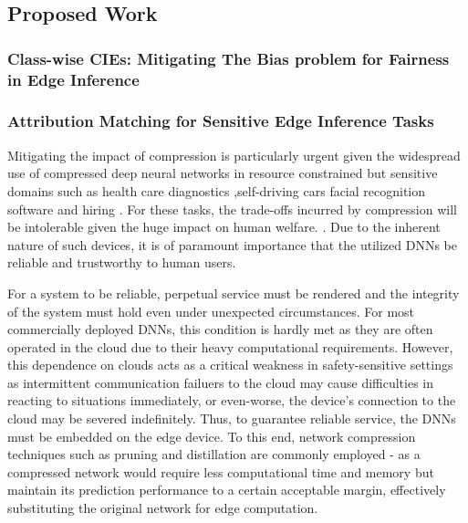 \subsection{Proposed Work}

\subsubsection{Class-wise CIEs: Mitigating The Bias problem for Fairness in Edge Inference}

\subsubsection{Attribution Matching for Sensitive Edge Inference Tasks}

Mitigating the impact of compression is particularly
urgent given the widespread use of compressed deep 
neural networks in resource constrained but sensitive 
domains such as 
%
%
%
health care diagnostics 
\cite{xie2019automated, %
gruetzemacher20183d,    %
badgeley2019deep,       %
oakden2020hidden}       %
%
%
,self-driving cars 
\cite{teslacrash17} %
%
facial recognition software
\cite{
buolamwini2018gender%
} and
%
hiring
\cite{amazon18, 
yourface19}.%
%
%
For these tasks, the trade-offs incurred by 
compression will be intolerable given the huge impact 
on human welfare.
%
.
%
Due to the inherent nature of such devices, 
it is of paramount importance that the utilized 
DNNs be reliable and trustworthy to human users.
%

For a system to be reliable, perpetual service 
must be rendered and the integrity of the system 
must hold even under unexpected circumstances.
%
%
For most commercially deployed DNNs, this condition 
is hardly met as they are often operated in the 
cloud due to their heavy computational requirements.
%
%
However, this dependence on clouds acts as a 
critical weakness in safety-sensitive settings 
as intermittent communication failuers to the 
cloud may cause difficulties in reacting to 
situations immediately, or even-worse, 
the device's connection to the cloud may be 
severed indefinitely.
%
%
Thus, to guarantee reliable service, 
the DNNs must be embedded on the edge device.
%
%
%
To this end, network compression techniques such 
as pruning \cite{han2015deep,li2016pruning} and distillation \cite{hinton2015distilling,zagoruyko2016paying} 
are commonly employed - as a compressed network 
would require less computational time and memory 
but maintain its prediction performance to a 
certain acceptable margin, effectively substituting 
the original network for edge computation.

